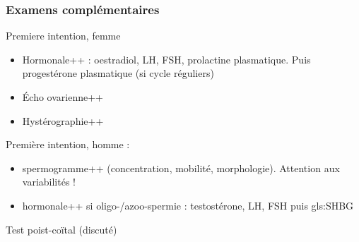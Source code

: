 \documentclass[11pt]{article}
\begin{document}
\subsubsection{Examens complémentaires}
\label{sec:org47fe97d}
Premiere intention, femme
\begin{itemize}
\item Hormonale++ : oestradiol, LH, FSH, prolactine plasmatique. Puis progestérone plasmatique (si cycle réguliers)
\item Écho ovarienne++
\item Hystérographie++
\end{itemize}
Première intention, homme :
\begin{itemize}
\item spermogramme++ (concentration, mobilité, morphologie). Attention aux variabilités !
\item hormonale++ si oligo-/azoo-spermie : testostérone, LH, FSH puis gls:SHBG
\end{itemize}
Test poist-coïtal (discuté)
\end{document}
